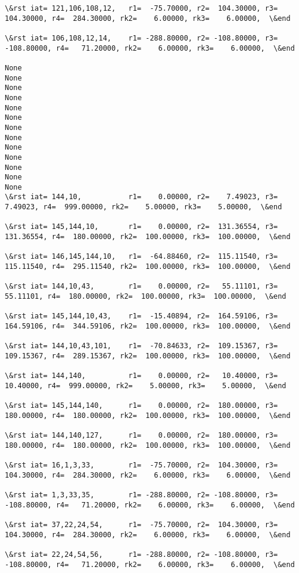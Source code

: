 \documentclass[11pt]{article}
\begin{document}
\begin{Verbatim}[commandchars=\\\{\}]
\&rst iat= 121,106,108,12,   r1=  -75.70000, r2=  104.30000, r3=  104.30000, r4=  284.30000, rk2=    6.00000, rk3=    6.00000,  \&end

\&rst iat= 106,108,12,14,    r1= -288.80000, r2= -108.80000, r3= -108.80000, r4=   71.20000, rk2=    6.00000, rk3=    6.00000,  \&end

None
None
None
None
None
None
None
None
None
None
None
None
None
\&rst iat= 144,10,           r1=    0.00000, r2=    7.49023, r3=    7.49023, r4=  999.00000, rk2=    5.00000, rk3=    5.00000,  \&end

\&rst iat= 145,144,10,       r1=    0.00000, r2=  131.36554, r3=  131.36554, r4=  180.00000, rk2=  100.00000, rk3=  100.00000,  \&end

\&rst iat= 146,145,144,10,   r1=  -64.88460, r2=  115.11540, r3=  115.11540, r4=  295.11540, rk2=  100.00000, rk3=  100.00000,  \&end

\&rst iat= 144,10,43,        r1=    0.00000, r2=   55.11101, r3=   55.11101, r4=  180.00000, rk2=  100.00000, rk3=  100.00000,  \&end

\&rst iat= 145,144,10,43,    r1=  -15.40894, r2=  164.59106, r3=  164.59106, r4=  344.59106, rk2=  100.00000, rk3=  100.00000,  \&end

\&rst iat= 144,10,43,101,    r1=  -70.84633, r2=  109.15367, r3=  109.15367, r4=  289.15367, rk2=  100.00000, rk3=  100.00000,  \&end

\&rst iat= 144,140,          r1=    0.00000, r2=   10.40000, r3=   10.40000, r4=  999.00000, rk2=    5.00000, rk3=    5.00000,  \&end

\&rst iat= 145,144,140,      r1=    0.00000, r2=  180.00000, r3=  180.00000, r4=  180.00000, rk2=  100.00000, rk3=  100.00000,  \&end

\&rst iat= 144,140,127,      r1=    0.00000, r2=  180.00000, r3=  180.00000, r4=  180.00000, rk2=  100.00000, rk3=  100.00000,  \&end

\&rst iat= 16,1,3,33,        r1=  -75.70000, r2=  104.30000, r3=  104.30000, r4=  284.30000, rk2=    6.00000, rk3=    6.00000,  \&end

\&rst iat= 1,3,33,35,        r1= -288.80000, r2= -108.80000, r3= -108.80000, r4=   71.20000, rk2=    6.00000, rk3=    6.00000,  \&end

\&rst iat= 37,22,24,54,      r1=  -75.70000, r2=  104.30000, r3=  104.30000, r4=  284.30000, rk2=    6.00000, rk3=    6.00000,  \&end

\&rst iat= 22,24,54,56,      r1= -288.80000, r2= -108.80000, r3= -108.80000, r4=   71.20000, rk2=    6.00000, rk3=    6.00000,  \&end


\end{Verbatim}
\end{document}
